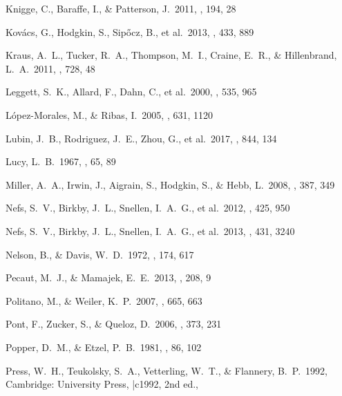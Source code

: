 \documentclass[fleqn,usenatbib]{mnras}
\begin{document}
\begin{thebibliography}{99}
 Knigge, C., Baraffe, I., \& Patterson, J.\ 2011, \apjs, 194, 28

 Kov{\'a}cs, G., Hodgkin, S., Sip{\H o}cz, B., et al.\ 2013, \mnras, 433, 889 

 Kraus, A.~L., Tucker, R.~A., Thompson, M.~I., Craine, E.~R., \& Hillenbrand, L.~A.\ 2011, \apj, 728, 48 

 Leggett, S.~K., Allard, F., Dahn, C., et al.\ 2000, \apj, 535, 965

 L{\'o}pez-Morales, M., \& Ribas, I.\ 2005, \apj, 631, 1120 

 Lubin, J.~B., Rodriguez, J.~E., Zhou, G., et al.\ 2017, \apj, 844, 134 

 Lucy, L.~B.\ 1967, \zap, 65, 89 

 Miller, A.~A., Irwin, J., Aigrain, S., Hodgkin, S., \& Hebb, L.\ 2008, \mnras, 387, 349 

 Nefs, S.~V., Birkby, J.~L., Snellen, I.~A.~G., et al.\ 2012, \mnras, 425, 950 

 Nefs, S.~V., Birkby, J.~L., Snellen, I.~A.~G., et al.\ 2013, \mnras, 431, 3240 

 Nelson, B., \& Davis, W.~D.\ 1972, \apj, 174, 617 

 Pecaut, M.~J., \& Mamajek, E.~E.\ 2013, \apjs, 208, 9 

 Politano, M., \& Weiler, K.~P.\ 2007, \apj, 665, 663 

 Pont, F., Zucker, S., \& Queloz, D.\ 2006, \mnras, 373, 231 

 Popper, D.~M., \& Etzel, P.~B.\ 1981, \aj, 86, 102 

 Press, W.~H., Teukolsky, S.~A., Vetterling, W.~T., \& Flannery, B.~P.\ 1992, Cambridge: University Press, |c1992, 2nd ed.,  


\end{thebibliography}
\end{document}
